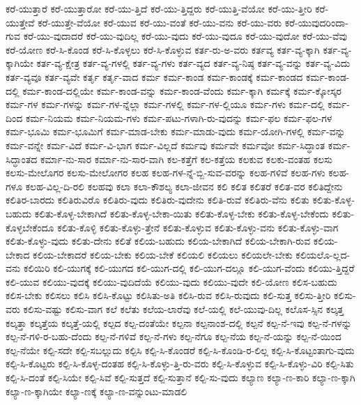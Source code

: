 {ಕರೆ-ಯುತ್ತಾರೆ
ಕರೆ-ಯುತ್ತಾರೋ
ಕರೆ-ಯು-ತ್ತಿದೆ
ಕರೆ-ಯು-ತ್ತಿದ್ದರು
ಕರೆ-ಯುತ್ತಿ-ವೆಯೋ
ಕರೆ-ಯು-ತ್ತೀರಿ
ಕರೆ-ಯುತ್ತೇವೆ
ಕರೆ-ಯುತ್ತೇ-ವೆಯೋ
ಕರೆ-ಯುವ
ಕರೆ-ಯು-ವಂತೆ
ಕರೆ-ಯು-ವನು
ಕರೆ-ಯು-ವರು
ಕರೆ-ಯುವುದರಿಂದಾ-ಗುವ
ಕರೆ-ಯು-ವುದಾದರೆ
ಕರೆ-ಯು-ವುದಿಲ್ಲ
ಕರೆ-ಯು-ವುದು
ಕರೆ-ಯು-ವುದೂ
ಕರೆ-ಯು-ವುದೋ
ಕರೆ-ಯು-ವೆವು
ಕರೆ-ಯೋಣ
ಕರೆ-ಸಿ-ಕೊಂಡ
ಕರೆ-ಸಿ-ಕೊಳ್ಳಲು
ಕರೆ-ಸಿ-ಕೊಳ್ಳುವ
ಕರ್ತ-ರು-ಅ-ವರು
ಕರ್ತವ್ಯ
ಕರ್ತ-ವ್ಯ-ಕ್ಕಾಗಿ
ಕರ್ತ-ವ್ಯ-ಕ್ಕಾಗಿಯೇ
ಕರ್ತ-ವ್ಯ-ಕ್ಷೇತ್ರ
ಕರ್ತ-ವ್ಯ-ಗಳಲ್ಲಿ
ಕರ್ತ-ವ್ಯ-ಗಳು
ಕರ್ತ-ವ್ಯದ
ಕರ್ತ-ವ್ಯ-ನಿಷ್ಠ
ಕರ್ತ-ವ್ಯ-ವನ್ನು
ಕರ್ತ-ವ್ಯ-ವಿದು
ಕರ್ತ-ವ್ಯವೂ
ಕರ್ತ-ವ್ಯವೇ
ಕರ್ತೃ
ಕರ್ತೃ-ವಾದ
ಕರ್ಮ
ಕರ್ಮ-ಕಾಂಡ
ಕರ್ಮ-ಕಾಂಡಕ್ಕೆ
ಕರ್ಮ-ಕಾಂಡದ
ಕರ್ಮ-ಕಾಂಡ-ದಲ್ಲಿ
ಕರ್ಮ-ಕಾಂಡ-ದಲ್ಲಿಯೇ
ಕರ್ಮ-ಕಾಂಡ-ವನ್ನು
ಕರ್ಮ-ಕಾಂಡ-ವೆಂದು
ಕರ್ಮ-ಕ್ಕಾಗಿ
ಕರ್ಮಕ್ಕೆ
ಕರ್ಮ-ಕ್ಕೋಸ್ಕರ
ಕರ್ಮ-ಗಳ
ಕರ್ಮ-ಗಳನ್ನು
ಕರ್ಮ-ಗಳ-ನ್ನೆಲ್ಲಾ
ಕರ್ಮ-ಗಳಲ್ಲಿ
ಕರ್ಮ-ಗಳ-ಲ್ಲಿಯೂ
ಕರ್ಮ-ಗಳು
ಕರ್ಮ-ದಲ್ಲಿ
ಕರ್ಮ-ದಿಂದ
ಕರ್ಮ-ನಿಯಮ
ಕರ್ಮ-ನಿಯಮ-ಗಳು
ಕರ್ಮ-ಪಟು-ಗಳಾಗಿ-ರು-ವುದನ್ನು
ಕರ್ಮ-ಫಲ
ಕರ್ಮ-ಫಲ-ಗಳ
ಕರ್ಮ-ಭೂಮಿ
ಕರ್ಮ-ಭೂಮಿಗೆ
ಕರ್ಮ-ಮಾಡ-ಬೇಕು
ಕರ್ಮ-ಮಾಡು-ವುದು
ಕರ್ಮ-ಯೋಗಿ-ಗಳಲ್ಲಿ
ಕರ್ಮ-ವನ್ನು
ಕರ್ಮ-ವನ್ನೇ
ಕರ್ಮ-ವಿದೆ
ಕರ್ಮ-ವಿ-ಭಾಗ
ಕರ್ಮ-ವಿಲ್ಲದೆ
ಕರ್ಮವು
ಕರ್ಮವೇ
ಕರ್ಮವೋ
ಕರ್ಮ-ಸಿದ್ಧಾಂತ
ಕರ್ಮ-ಸಿದ್ಧಾಂತದ
ಕರ್ಮಾ-ನು-ಸಾರ
ಕರ್ಮಾ-ನು-ಸಾರ-ವಾಗಿ
ಕಲ-ಕತ್ತೆಗೆ
ಕಲ-ಕತ್ತೆಯ
ಕಲಕುವ
ಕಲಕು-ವಂತಹ
ಕಲಸು
ಕಲಸು-ಮೇಲೊಗರ
ಕಲಸು-ಮೇಲೋಗರ
ಕಲಹ
ಕಲಹ-ಗಳ-ನ್ನೆ-ಬ್ಬಿ-ಸುವ-ವರನ್ನು
ಕಲಹ-ಗಳಿವೆ
ಕಲಹ-ಗಳು
ಕಲಹ-ಗಳೂ
ಕಲಹ-ವಿಲ್ಲ-ದಿ-ರಲಿ
ಕಲಹವು
ಕಲಾ
ಕಲಾ-ಕೌಶಲ್ಯ
ಕಲಾ-ಜೀವನ
ಕಲಿ
ಕಲಿತ
ಕಲಿತರೆ
ಕಲಿತ-ವರ
ಕಲಿತಿದ್ದೇನು
ಕಲಿತಿರ-ಬಾರದು
ಕಲಿತಿರುವಿರೊ
ಕಲಿತಿರು-ವುದು
ಕಲಿತಿರು-ವುದೇನು
ಕಲಿತಿ-ರುವೆ
ಕಲಿತಿರು-ವೆನು
ಕಲಿತು
ಕಲಿತು-ಕೊಳ್ಳ-ಬಹುದು
ಕಲಿತು-ಕೊಳ್ಳ-ಬೇಕಾಗಿದೆ
ಕಲಿತು-ಕೊಳ್ಳ-ಬೇಕಾ-ಯಿತು
ಕಲಿತು-ಕೊಳ್ಳ-ಬೇಕು
ಕಲಿತು-ಕೊಳ್ಳ-ಬೇಕೆಂದು
ಕಲಿತು-ಕೊಳ್ಳಬೇಕೆಂದೂ
ಕಲಿತು-ಕೊಳ್ಳಿ
ಕಲಿತು-ಕೊಳ್ಳು-ತ್ತೇನೆ
ಕಲಿತು-ಕೊಳ್ಳುವ
ಕಲಿತು-ಕೊಳ್ಳು-ವನು
ಕಲಿತು-ಕೊಳ್ಳು-ವಾಗ
ಕಲಿತು-ಕೊಳ್ಳು-ವುದು
ಕಲಿತು-ದೇನು
ಕಲಿತೆ
ಕಲಿಯ-ಬಹುದು
ಕಲಿಯ-ಬೇಕಾಗಿದೆ
ಕಲಿಯ-ಬೇಕಾಗಿ-ರುವ
ಕಲಿಯ-ಬೇಕಾದ
ಕಲಿಯ-ಬೇಕಾದರೆ
ಕಲಿಯ-ಬೇಕು
ಕಲಿಯ-ಬೇಕೆ
ಕಲಿಯಲಿ
ಕಲಿಯಲು
ಕಲಿಯಲೇ-ಬೇಕು
ಕಲಿಯಲೊ-ಲ್ಲದ-ವನು
ಕಲಿಯಿರಿ
ಕಲಿ-ಯುಗಕ್ಕೆ
ಕಲಿ-ಯುಗದ
ಕಲಿ-ಯುಗ-ದಲ್ಲಿ
ಕಲಿ-ಯುಗ-ದಲ್ಲೂ
ಕಲಿ-ಯುಗ-ವೆಂದು
ಕಲಿಯು-ತ್ತಿದ್ದರೆ
ಕಲಿ-ಯುವ
ಕಲಿಯು-ವುದಕ್ಕೆ
ಕಲಿಯು-ವುದಿದೆಯೆ
ಕಲಿಯು-ವುದು
ಕಲಿಯು-ವುದೇ
ಕಲಿ-ಯೋಣ
ಕಲಿಸ-ಬಹುದು
ಕಲಿಸ-ಬೇಕು
ಕಲಿಸಲು
ಕಲಿಸಿ
ಕಲಿಸಿ-ಕೊಟ್ಟು
ಕಲಿಸಿತು-ಅತಿ
ಕಲಿಸಿ-ರುವ
ಕಲಿಸಿ-ರುವುದು
ಕಲಿ-ಸುತ್ತ
ಕಲಿಸು-ತ್ತೀರಿ
ಕಲಿಸು-ವರು
ಕಲಿಸು-ವಷ್ಟು
ಕಲಿಸು-ವಾಗ
ಕಲೆ
ಕಲೆತು
ಕಲೆಯ-ಲಾರೆವು
ಕಲೆ-ಯಲ್ಲಿ
ಕಲೆ-ಯುವು-ದಿಲ್ಲ
ಕಲೊಸ-ಸ್ಸಿನ
ಕಲ್ಕತ್ತ
ಕಲ್ಕತ್ತಾ
ಕಲ್ಕತ್ತೆಯ
ಕಲ್ಕತ್ತೆ-ಯಲ್ಲಿ
ಕಲ್ಪದ
ಕಲ್ಪ-ದಂತೆಯೇ
ಕಲ್ಪನಾ
ಕಲ್ಪನಾಂಶ-ದಲ್ಲಿ
ಕಲ್ಪನೆ
ಕಲ್ಪ-ನೆ-ಇವು
ಕಲ್ಪ-ನೆ-ಗಳನ್ನು
ಕಲ್ಪ-ನೆ-ಗಳಿ-ರ-ಬಹು-ದೆಂದು
ಕಲ್ಪ-ನೆ-ಗಳಿವೆ
ಕಲ್ಪ-ನೆ-ಗಳು
ಕಲ್ಪ-ನೆಗೂ
ಕಲ್ಪ-ನೆಯ
ಕಲ್ಪ-ನೆ-ಯನ್ನು
ಕಲ್ಪ-ನೆ-ಯಿಂದ
ಕಲ್ಪ-ನೆಯೇ
ಕಲ್ಪಿ-ಸದೇ
ಕಲ್ಪಿ-ಸಬಲ್ಲುದು
ಕಲ್ಪಿಸಿ
ಕಲ್ಪಿ-ಸಿ-ಕೊಂಡರೆ
ಕಲ್ಪಿ-ಸಿ-ಕೊಂಡಿ-ರ-ಲಿಲ್ಲ
ಕಲ್ಪಿ-ಸಿ-ಕೊಟ್ಟಂತಾಗು-ವುದು
ಕಲ್ಪಿ-ಸಿ-ಕೊಟ್ಟರು
ಕಲ್ಪಿ-ಸಿ-ಕೊಳ್ಳ-ದಂತಹ
ಕಲ್ಪಿ-ಸಿ-ಕೊಳ್ಳು-ತ್ತಿ-ರು-ವರು
ಕಲ್ಪಿ-ಸಿ-ಕೊಳ್ಳುವ
ಕಲ್ಪಿ-ಸಿ-ಕೊಳ್ಳು-ವಿರಿ
ಕಲ್ಪಿ-ಸಿತು
ಕಲ್ಪಿ-ಸಿ-ದಂತೆ
ಕಲ್ಪಿ-ಸಿಯೇ
ಕಲ್ಪಿ-ಸಿವೆ
ಕಲ್ಪಿ-ಸುತ್ತದೆ
ಕಲ್ಪಿ-ಸುತ್ತಾನೆ
ಕಲ್ಪಿ-ಸು-ವುದು
ಕಲ್ಯಾಣ
ಕಲ್ಯಾ-ಣ-ಕಾರಿ
ಕಲ್ಯಾ-ಣ-ಕ್ಕಾಗಿ
ಕಲ್ಯಾ-ಣ-ಕ್ಕಾಗಿಯೇ
ಕಲ್ಯಾ-ಣಕ್ಕೆ
ಕಲ್ಯಾ-ಣ-ವನ್ನುಂಟು-ಮಾಡಲಿ
}
